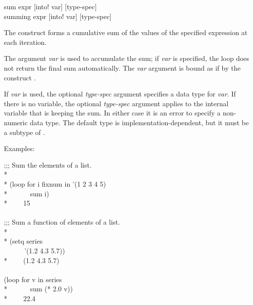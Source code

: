 \begin{defloop}
sum expr [\!into! var] [type-spec] \\
summing expr [\!into! var] [type-spec]

The  construct forms a cumulative sum of the values of the
specified expression at each iteration.

The argument \emph{var\/} is used to accumulate
the sum; if \emph{var} is specified, the loop
does not return the final sum automatically.  The \emph{var\/} argument
is bound as if by the construct .

If  \emph{var\/} is used, the optional
\emph{type-spec\/} argument specifies a data type for \emph{var\/}.
If there is no  variable, the optional \emph{type-spec\/}
argument applies to the internal variable that is keeping the sum.
In either case it is an error to specify a non-numeric 
data type.
The default type is implementation-dependent, but it must be a subtype
of .

Examples:
\begin{lisp}
;;; Sum the elements of a list. \\*
\\*
(loop for i fixnum in '(1 2 3 4 5) \\*
~~~~~~sum i) \\*
~~~\EV~15 \\
\\
;;; Sum a function of elements of a list. \\*
\\*
(setq series \\
~~~~~~'(1.2 4.3 5.7)) \\*
~~~\EV~(1.2 4.3 5.7) \\
\\
(loop for v in series  \\*
~~~~~~sum (* 2.0 v)) \\*
~~~\EV~22.4
\end{lisp}
\end{defloop}

